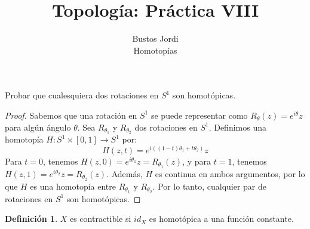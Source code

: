 \documentclass{article}
\theoremstyle{plain}
\theoremstyle{definition}
\newtheorem{definition}{Definición}[section]
\newenvironment{ejercicio}[1]{\begin{trivlist}
\item[\hskip \labelsep {\bfseries Ejercicio}\hskip \labelsep {\bfseries #1.}]}{\end{trivlist}}
\begin{document}
\title{Topología: Práctica VIII}
\author{Bustos Jordi\\Homotopías}

\maketitle

\begin{ejercicio}{1}
    Probar que cualesquiera dos rotaciones en \( S^{1} \) son homotópicas.
\end{ejercicio}
\begin{proof}
    Sabemos que una rotación en \( S^1 \) se puede representar como \( R_\theta(z) = e^{i\theta}z \) para algún ángulo \( \theta \). Sea \( R_{\theta_1} \) y \( R_{\theta_2} \) dos rotaciones en \( S^1 \). Definimos una homotopía \( H: S^1 \times [0,1] \to S^1 \) por:
    \[
        H(z, t) = e^{i((1-t)\theta_1 + t\theta_2)}z
    \]
    Para \( t=0 \), tenemos \( H(z, 0) = e^{i\theta_1}z = R_{\theta_1}(z) \), y para \( t=1 \), tenemos \( H(z, 1) = e^{i\theta_2}z = R_{\theta_2}(z) \). Además, \( H \) es continua en ambos argumentos, por lo que \( H \) es una homotopía entre \( R_{\theta_1} \) y \( R_{\theta_2} \). Por lo tanto, cualquier par de rotaciones en \( S^1 \) son homotópicas.
\end{proof}

\vspace{0.5cm}

\begin{definition}
    \( X \) es contractible si \( id_X \) es homotópica a una función constante.
\end{definition}
\end{document}
